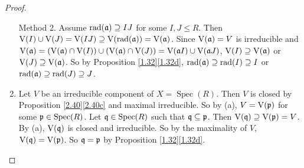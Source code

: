 \begin{proof}
\begin{enumerate}
        Method 2. Assume $\operatorname{rad}(\mathfrak{a}) \supseteq IJ$ for some $I,J \leq R$. Then $\operatorname{V}(I) \cup \operatorname{V}(J) = \operatorname{V}(IJ) \supseteq \operatorname{V}(\operatorname{rad}(\mathfrak{a})) = \operatorname{V}(\mathfrak{a})$. Since $\operatorname{V}(\mathfrak{a}) = V$ is irreducible and $\operatorname{V}(\mathfrak{a}) = (\operatorname{V}(\mathfrak{a}) \cap \operatorname{V}(I)) \cup (\operatorname{V}(\mathfrak{a}) \cap \operatorname{V}(J)) = \operatorname{V}(\mathfrak{a} I) \cup \operatorname{V}(\mathfrak{a} J)$, $\operatorname{V}(I) \supseteq \operatorname{V}(\mathfrak{a})$ or $\operatorname{V}(J) \supseteq \operatorname{V}(\mathfrak{a})$. So by Proposition \ref{1.32}\ref{1.32d}, $\operatorname{rad}(\mathfrak{a}) \supseteq \operatorname{rad}(I) \supseteq I$ or $\operatorname{rad}(\mathfrak{a}) \supseteq \operatorname{rad}(J) \supseteq J$.
    \item Let $V$ be an irreducible component of $X = \operatorname{Spec}(R)$. Then $V$ is closed by Proposition \ref{2.40}\ref{2.40c} and maximal irreducible. So by (a), $V = \operatorname{V}(\mathfrak{p})$ for some $\mathfrak{p} \in \operatorname{Spec}(R)$. Let $\mathfrak{q} \in \operatorname{Spec}(R)$ such that $\mathfrak{q} \subseteq \mathfrak{p}$. Then $\operatorname{V}(\mathfrak{q}) \supseteq \operatorname{V}(\mathfrak{p}) = V$. By (a), $\operatorname{V}(\mathfrak{q})$ is closed and irreducible. So by the maximality of $V$, $\operatorname{V}(\mathfrak{q}) = \operatorname{V}(\mathfrak{p})$. So $\mathfrak{q} = \mathfrak{p}$ by Proposition \ref{1.32}\ref{1.32d}. \qedhere
    \end{enumerate}
\end{proof}

